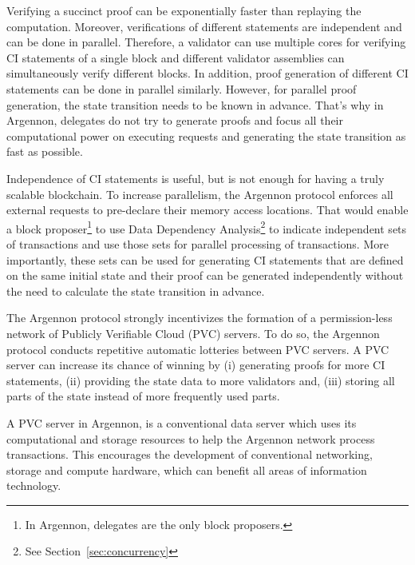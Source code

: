 Verifying a succinct proof can be exponentially faster than replaying the computation. Moreover, verifications of
different statements are independent and can be done in parallel. Therefore, a validator can use multiple cores for
verifying CI statements of a single block and different validator assemblies can simultaneously verify different blocks.
In addition, proof generation of different CI statements can be done in parallel similarly. However, for parallel
proof generation, the state transition needs to be known in advance. That's why in Argennon, delegates do not try
to generate proofs and focus all their computational power on executing requests and generating the state transition
as fast as possible.

Independence of CI statements is useful, but is not enough for having a truly scalable blockchain. To increase
parallelism, the Argennon protocol enforces all external requests to pre-declare their memory access locations. That
would enable a block proposer\footnote{In Argennon, delegates are the only block proposers.} to use Data Dependency
Analysis\footnote{See Section~\ref{sec:concurrency}} to indicate independent sets of transactions and use those sets
for parallel processing of transactions. More importantly, these sets can be used for generating CI statements that
are defined on the same initial state and their proof can be generated independently without the need to calculate
the state transition in advance.

The Argennon protocol strongly incentivizes the formation of a permission-less network of Publicly Verifiable
Cloud (PVC) servers. To do so, the Argennon protocol conducts repetitive automatic lotteries between PVC servers.
A PVC server can increase its chance of winning by (i) generating proofs for more CI statements, (ii) providing the
state data to more validators and, (iii) storing all parts of the state instead of more frequently used parts.

A PVC server in Argennon, is a conventional data server which uses its computational and
storage resources to help the Argennon network process transactions. This encourages the development
of conventional networking, storage and compute hardware, which can benefit all areas of information technology.
